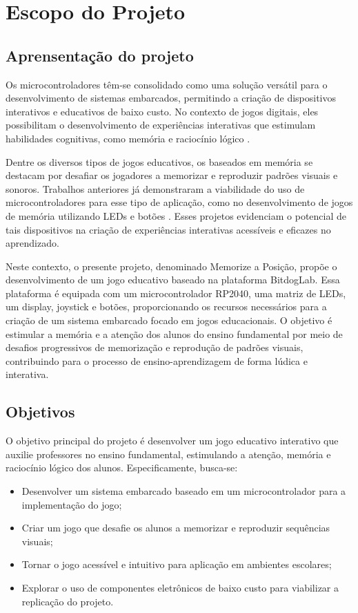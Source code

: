 \section{Escopo do Projeto}\label{sec:introducao}

\subsection{Aprensentação do projeto}
Os microcontroladores têm-se consolidado como uma solução versátil para o desenvolvimento de sistemas embarcados, permitindo a criação de dispositivos interativos e educativos de baixo custo. No contexto de jogos digitais, eles possibilitam o desenvolvimento de experiências interativas que estimulam habilidades cognitivas, como memória e raciocínio lógico \cite{valente1999aprendizado, prensky2001digital}.

Dentre os diversos tipos de jogos educativos, os baseados em memória se destacam por desafiar os jogadores a memorizar e reproduzir padrões visuais e sonoros. Trabalhos anteriores já demonstraram a viabilidade do uso de microcontroladores para esse tipo de aplicação, como no desenvolvimento de jogos de memória utilizando LEDs e botões \cite{gomes2011memoria} \cite{gamebuino2016} \cite{makerbuino2016}. Esses projetos evidenciam o potencial de tais dispositivos na criação de experiências interativas acessíveis e eficazes no aprendizado.

Neste contexto, o presente projeto, denominado Memorize a Posição, propõe o desenvolvimento de um jogo educativo baseado na plataforma BitdogLab. Essa plataforma é equipada com um microcontrolador RP2040, uma matriz de LEDs, um display, joystick e botões, proporcionando os recursos necessários para a criação de um sistema embarcado focado em jogos educacionais. O objetivo é estimular a memória e a atenção dos alunos do ensino fundamental por meio de desafios progressivos de memorização e reprodução de padrões visuais, contribuindo para o processo de ensino-aprendizagem de forma lúdica e interativa.

\subsection{Objetivos}
O objetivo principal do projeto é desenvolver um jogo educativo interativo que auxilie professores no ensino fundamental, estimulando a atenção, memória e raciocínio lógico dos alunos. Especificamente, busca-se:

\begin{itemize}
\item Desenvolver um sistema embarcado baseado em um microcontrolador para a implementação do jogo;
\item Criar um jogo que desafie os alunos a memorizar e reproduzir sequências visuais;
\item Tornar o jogo acessível e intuitivo para aplicação em ambientes escolares;
\item Explorar o uso de componentes eletrônicos de baixo custo para viabilizar a replicação do projeto.
\end{itemize}

